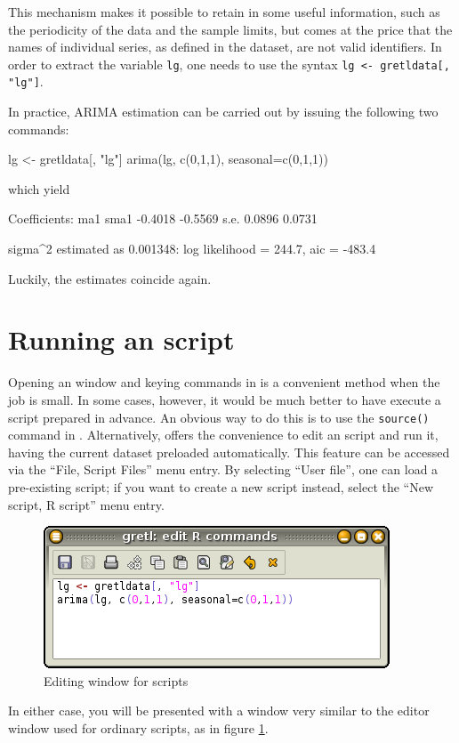 This mechanism makes it possible to retain in  some useful
information, such as the periodicity of the data and the sample
limits, but comes at the price that the names of individual series, as
defined in the  dataset, are not valid identifiers. In
order to extract the variable \texttt{lg}, one needs to use the syntax
\verb|lg <- gretldata[, "lg"]|.

In practice, ARIMA estimation can be carried out by issuing the
following two  commands:
\begin{code}
lg <- gretldata[, "lg"]
arima(lg, c(0,1,1), seasonal=c(0,1,1))
\end{code}

which yield

\begin{code}
Coefficients:
          ma1     sma1
      -0.4018  -0.5569
s.e.   0.0896   0.0731

sigma^2 estimated as 0.001348:  log likelihood = 244.7,  aic = -483.4
\end{code}

Luckily, the estimates coincide again.

\section{Running an  script}
\label{sec:R-scripts}

Opening an  window and keying commands in is a convenient method when
the job is small. In some cases, however, it would be much better to
have  execute a script prepared in advance. An obvious way to
do this is to use the \texttt{source()} command in
. Alternatively,  offers the convenience to edit an
 script and run it, having the current dataset preloaded
automatically. This feature can be accessed via the ``File, Script
Files'' menu entry. By selecting ``User file'', one can load a
pre-existing  script; if you want to create a new script
instead, select the ``New script, R script'' menu entry.

\begin{figure}[htbp]
  \centering
  \includegraphics[scale=0.7]{figures/R-edit1}
  \caption{Editing window for  scripts}
  \label{fig:R-edit1}
\end{figure}
In either case, you will be presented with a window very similar to
the editor window used for ordinary  scripts, as in figure
\ref{fig:R-edit1}. 

